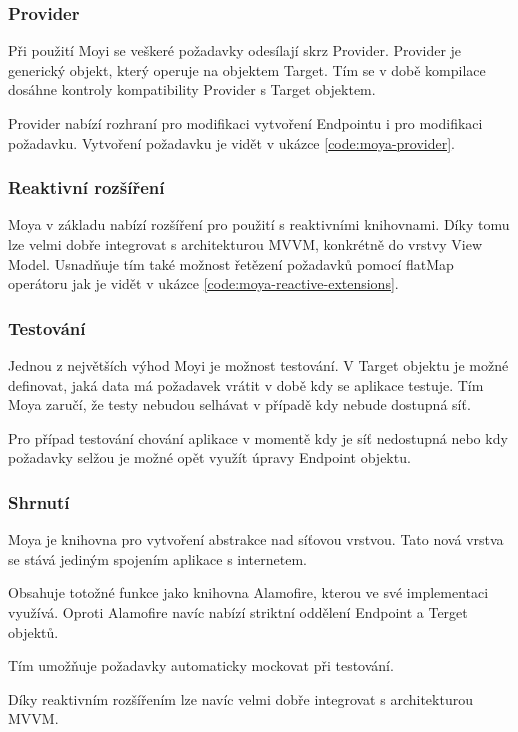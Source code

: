 \subsubsection{Provider}

Při použití Moyi se veškeré požadavky odesílají skrz Provider.
Provider je generický objekt, který operuje na objektem Target.
Tím se v době kompilace dosáhne kontroly kompatibility Provider s Target objektem.

Provider nabízí rozhraní pro modifikaci vytvoření Endpointu i pro modifikaci požadavku.
Vytvoření požadavku je vidět v ukázce \ref{code:moya-provider}.


\subsubsection{Reaktivní rozšíření}

Moya v základu nabízí rozšíření pro použití s reaktivními knihovnami.
Díky tomu lze velmi dobře integrovat s architekturou MVVM, konkrétně do vrstvy View Model.
Usnadňuje tím také možnost řetězení požadavků pomocí flatMap operátoru jak je vidět v ukázce \ref{code:moya-reactive-extensions}.


\subsubsection{Testování}

Jednou z největších výhod Moyi je možnost testování.
V Target objektu je možné definovat, jaká data má požadavek vrátit v době kdy se aplikace testuje.
Tím Moya zaručí, že testy nebudou selhávat v případě kdy nebude dostupná síť.

Pro případ testování chování aplikace v momentě kdy je síť nedostupná nebo kdy požadavky selžou je možné opět využít úpravy Endpoint objektu.

\subsubsection{Shrnutí}

Moya je knihovna pro vytvoření abstrakce nad síťovou vrstvou.
Tato nová vrstva se stává jediným spojením aplikace s internetem.

Obsahuje totožné funkce jako knihovna Alamofire, kterou ve své implementaci využívá.
Oproti Alamofire navíc nabízí striktní oddělení Endpoint a Terget objektů.

Tím umožňuje požadavky automaticky mockovat při testování.

Díky reaktivním rozšířením lze navíc velmi dobře integrovat s architekturou MVVM.